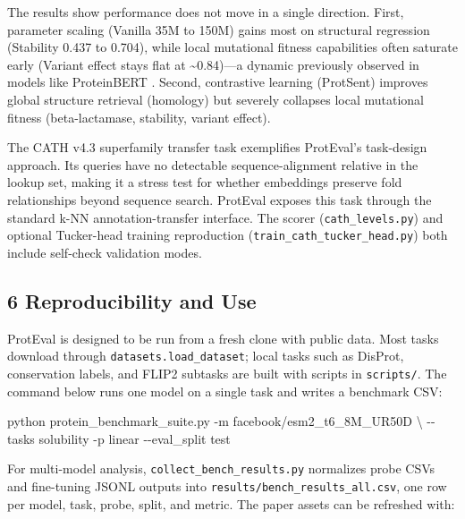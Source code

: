 \documentclass[
]{article}
\newenvironment{Shaded}{}{}
\newcommand{\AttributeTok}[1]{\textcolor[rgb]{0.49,0.56,0.16}{#1}}
\newcommand{\DataTypeTok}[1]{\textcolor[rgb]{0.56,0.13,0.00}{#1}}
\newcommand{\ExtensionTok}[1]{#1}
\newcommand{\NormalTok}[1]{#1}
\begin{document}
The results show performance does not move in a single direction. First,
parameter scaling (Vanilla 35M to 150M) gains most on structural
regression (Stability 0.437 to 0.704),
while local mutational fitness capabilities often saturate early
(Variant effect stays flat at \textasciitilde0.84)---a dynamic
previously observed in models like ProteinBERT
\autocite{brandes2022proteinbert}. Second, contrastive learning
(ProtSent) improves global structure retrieval (homology) but severely
collapses local mutational fitness (beta-lactamase, stability, variant
effect).

The CATH v4.3 superfamily transfer task exemplifies ProtEval's
task-design approach. Its queries have no detectable sequence-alignment
relative in the lookup set, making it a stress test for whether
embeddings preserve fold relationships beyond sequence search. ProtEval
exposes this task through the standard k-NN annotation-transfer
interface. The scorer (\texttt{cath\_levels.py}) and optional
Tucker-head training reproduction
(\texttt{train\_cath\_tucker\_head.py}) both include self-check
validation modes.

\subsection{6 Reproducibility and Use}\label{reproducibility-and-use}

ProtEval is designed to be run from a fresh clone with public data.
Most tasks download through \texttt{datasets.load\_dataset}; local tasks
such as DisProt, conservation labels, and FLIP2 subtasks are built with
scripts in \texttt{scripts/}. The command below runs one model on a
single task and writes a benchmark CSV:

\begin{Shaded}
\begin{Highlighting}[]
\ExtensionTok{python}\NormalTok{ protein\_benchmark\_suite.py }\AttributeTok{{-}m}\NormalTok{ facebook/esm2\_t6\_8M\_UR50D }\DataTypeTok{\textbackslash{}}
    \AttributeTok{{-}{-}tasks}\NormalTok{ solubility }\AttributeTok{{-}p}\NormalTok{ linear }\AttributeTok{{-}{-}eval\_split}\NormalTok{ test}
\end{Highlighting}
\end{Shaded}

For multi-model analysis, \texttt{collect\_bench\_results.py} normalizes
probe CSVs and fine-tuning JSONL outputs into
\texttt{results/bench\_results\_all.csv}, one row per model, task,
probe, split, and metric. The paper assets can be refreshed with:
\end{document}
